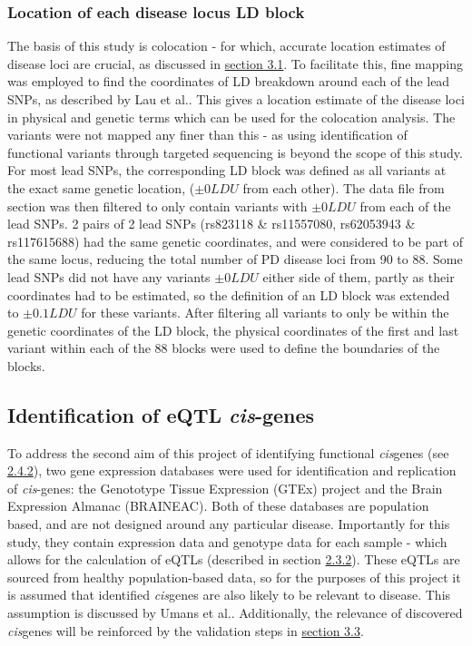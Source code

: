 \documentclass{article}
\begin{document}
\subsubsection{Location of each disease locus LD block}
\label{subsubsec:LDblock}
The basis of this study is colocation - for which, accurate location estimates of disease loci are crucial, as discussed in \hyperref[subsec:mapping]{section 3.1}. To facilitate this, fine mapping was employed to find the coordinates of LD breakdown around each of the lead SNPs, as described by Lau et al.\cite{Lau2017High-ResolutionEuropeans}. This gives a location estimate of the disease loci in physical and genetic terms which can be used for the colocation analysis. The variants were not mapped any finer than this - as using identification of functional variants through targeted sequencing is beyond the scope of this study. For most lead SNPs, the corresponding LD block was defined as all variants at the exact same genetic location, ($\pm0LDU$ from each other). The data file from section  was then filtered to only contain variants with $\pm0LDU$ from each of the lead SNPs. 2 pairs of 2 lead SNPs (rs823118 \& rs11557080, rs62053943 
\& rs117615688) had the same genetic coordinates, and were considered to be part of the same locus, reducing the total number of PD disease loci from 90 to 88. Some lead SNPs did not have any variants $\pm0LDU$ either side of them, partly as their coordinates had to be estimated, so the definition of an LD block was extended to $\pm0.1LDU$ for these variants. After filtering all variants to only be within the genetic coordinates of the LD block, the physical coordinates of the first and last variant within each of the 88 blocks were used to define the boundaries of the blocks. 

\subsection{Identification of eQTL \textit{cis}-genes}
\label{subsec:eQTL}
To address the second aim of this project of identifying functional \textit{cis}genes (see \hyperref[subsubsec:Aims]{2.4.2}),  two gene expression databases were used for identification and replication of \textit{cis}-genes: the Genototype Tissue Expression (GTEx) project\cite{Lonsdale2013TheProject} and the Brain Expression Almanac (BRAINEAC)\cite{Ramasamy2014GeneticBrain}. Both of these databases are population based, and are not designed around any particular disease. Importantly for this study, they contain expression data and genotype data for each sample - which allows for the calculation of eQTLs (described in section \hyperref[subsubsec:QTL]{2.3.2}). These eQTLs are sourced from healthy population-based data, so for the purposes of this project it is assumed that identified \textit{cis}genes are also likely to be relevant to disease. This assumption is discussed by Umans et al.\cite{Umans2021WhereEQTLs}. Additionally, the relevance of discovered \textit{cis}genes will be reinforced by the validation steps in \hyperref[subsec:validation]{section 3.3}.
\end{document}
